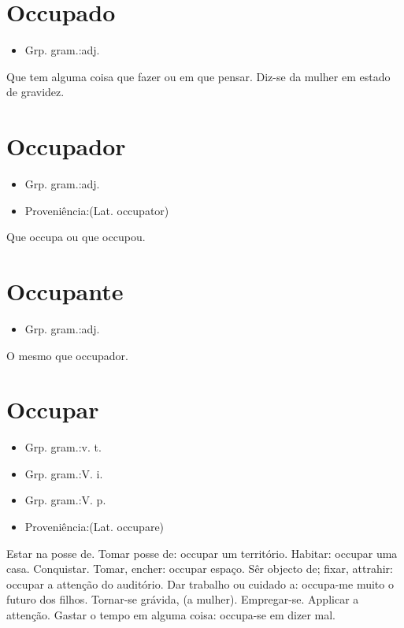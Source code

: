 \section{Occupado}
\begin{itemize}
\item {Grp. gram.:adj.}
\end{itemize}
Que tem alguma coisa que fazer ou em que pensar.
Diz-se da mulher em estado de gravidez.
\section{Occupador}
\begin{itemize}
\item {Grp. gram.:adj.}
\end{itemize}
\begin{itemize}
\item {Proveniência:(Lat. \textunderscore occupator\textunderscore )}
\end{itemize}
Que occupa ou que occupou.
\section{Occupante}
\begin{itemize}
\item {Grp. gram.:adj.}
\end{itemize}
O mesmo que \textunderscore occupador\textunderscore .
\section{Occupar}
\begin{itemize}
\item {Grp. gram.:v. t.}
\end{itemize}
\begin{itemize}
\item {Grp. gram.:V. i.}
\end{itemize}
\begin{itemize}
\item {Grp. gram.:V. p.}
\end{itemize}
\begin{itemize}
\item {Proveniência:(Lat. \textunderscore occupare\textunderscore )}
\end{itemize}
Estar na posse de.
Tomar posse de: \textunderscore occupar um território\textunderscore .
Habitar: \textunderscore occupar uma casa\textunderscore .
Conquistar.
Tomar, encher: \textunderscore occupar espaço\textunderscore .
Sêr objecto de; fixar, attrahir: \textunderscore occupar a attenção do auditório\textunderscore .
Dar trabalho ou cuidado a: \textunderscore occupa-me muito o futuro dos filhos\textunderscore .
Tornar-se grávida, (a mulher).
Empregar-se.
Applicar a attenção.
Gastar o tempo em alguma coisa: \textunderscore occupa-se em dizer mal\textunderscore .
